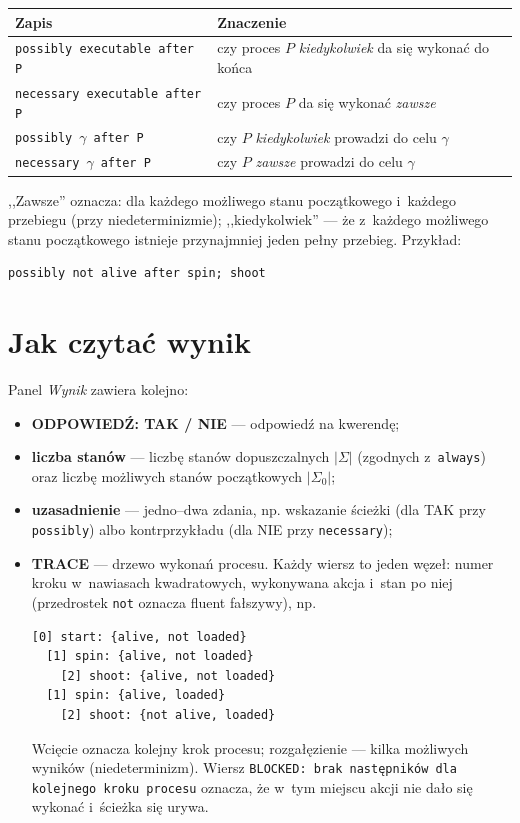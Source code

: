 \documentclass[11pt,a4paper]{article}
\begin{document}
\begin{center}
\small
\begin{tabular}{@{}ll@{}}
\toprule
\textbf{Zapis} & \textbf{Znaczenie} \\
\midrule
\texttt{possibly executable after P}  & czy proces $P$ \emph{kiedykolwiek} da się wykonać do końca \\
\texttt{necessary executable after P} & czy proces $P$ da się wykonać \emph{zawsze} \\
\texttt{possibly}~$\gamma$~\texttt{after P}  & czy $P$ \emph{kiedykolwiek} prowadzi do celu $\gamma$ \\
\texttt{necessary}~$\gamma$~\texttt{after P} & czy $P$ \emph{zawsze} prowadzi do celu $\gamma$ \\
\bottomrule
\end{tabular}
\end{center}

,,Zawsze'' oznacza: dla każdego możliwego stanu początkowego i~każdego
przebiegu (przy niedeterminizmie); ,,kiedykolwiek'' --- że z~każdego
możliwego stanu początkowego istnieje przynajmniej jeden pełny przebieg.
Przykład:

\begin{verbatim}
possibly not alive after spin; shoot
\end{verbatim}

\section{Jak czytać wynik}
\label{sec:wynik}

Panel \emph{Wynik} zawiera kolejno:

\begin{itemize}
  \item \textbf{ODPOWIEDŹ: TAK / NIE} --- odpowiedź na kwerendę;
  \item \textbf{liczba stanów} --- liczbę stanów dopuszczalnych $|\Sigma|$
        (zgodnych z~\texttt{always}) oraz liczbę możliwych stanów
        początkowych $|\Sigma_0|$;
  \item \textbf{uzasadnienie} --- jedno--dwa zdania, np. wskazanie ścieżki
        (dla TAK przy \texttt{possibly}) albo kontrprzykładu (dla NIE przy
        \texttt{necessary});
  \item \textbf{TRACE} --- drzewo wykonań procesu. Każdy wiersz to jeden
        węzeł: numer kroku w~nawiasach kwadratowych, wykonywana akcja
        i~stan po niej (przedrostek \texttt{not} oznacza fluent fałszywy), np.
\begin{verbatim}
[0] start: {alive, not loaded}
  [1] spin: {alive, not loaded}
    [2] shoot: {alive, not loaded}
  [1] spin: {alive, loaded}
    [2] shoot: {not alive, loaded}
\end{verbatim}
        Wcięcie oznacza kolejny krok procesu; rozgałęzienie --- kilka możliwych
        wyników (niedeterminizm). Wiersz \texttt{BLOCKED: brak następników dla
        kolejnego kroku procesu} oznacza, że w~tym miejscu akcji nie dało się
        wykonać i~ścieżka się urywa.
\end{itemize}
\end{document}
